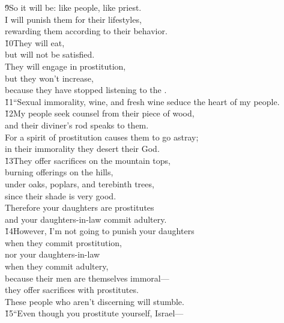 \begin{poetry}
\poeml \v{9}So it will be: like people, like priest. \\
\poemll    I will punish them for their lifestyles, \\
\poemlll       rewarding them according to their behavior. \\
\poeml \v{10}They will eat, \\
\poemll    but will not be satisfied. \\
\poeml They will engage in prostitution, \\
\poemll    but they won't increase, \\
\poemlll       because they have stopped listening to the . \\
\poeml \v{11}``Sexual immorality, wine, and fresh wine seduce the heart of my people. \\
\poeml \v{12}My people seek counsel from their piece of wood, \\
\poemll    and their diviner's rod speaks to them. \\
\poeml For a spirit of prostitution causes them to go astray; \\
\poemll    in their immorality they desert their God. \\
\poeml \v{13}They offer sacrifices on the mountain tops, \\
\poemll    burning offerings on the hills, \\
\poeml under oaks, poplars, and terebinth trees, \\
\poemll    since their shade is very good. \\
\poeml Therefore your daughters are prostitutes \\
\poemll    and your daughters-in-law commit adultery. \\
\poeml \v{14}However, I'm not going to punish your daughters \\
\poemll    when they commit prostitution, \\
\poeml nor your daughters-in-law \\
\poemll    when they commit adultery, \\
\poeml because their men are themselves immoral--- \\
\poemll    they offer sacrifices with prostitutes. \\
\poeml These people who aren't discerning will stumble. \\
\poeml \v{15}``Even though you prostitute yourself, Israel--- \\

\end{poetry}
